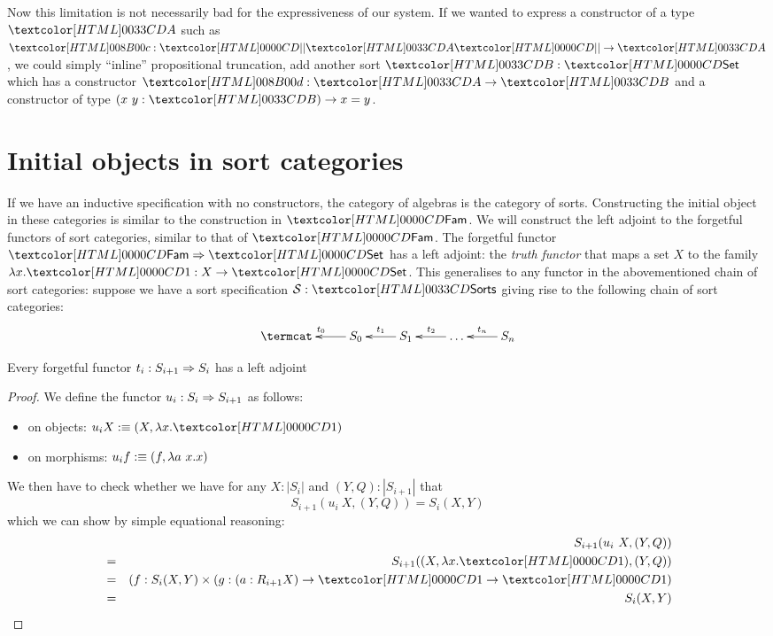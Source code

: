 Now this limitation is not necessarily bad for the expressiveness of
our system. If we wanted to express a constructor of a type $\Aty$
such as $\Ac : \proptrunc{\Aty} \to \Aty$, we could simply ``inline''
propositional truncation, \ie add another sort $\Bty : \Set$ which has
a constructor $\Bd : \Aty \to \Bty$ and a constructor of type
$(x\ y : \Bty) \to x = y$.

\section{Initial objects in sort categories}

If we have an inductive specification with no constructors, the
category of algebras is the category of sorts. Constructing the
initial object in these categories is similar to the construction in
$\Fam$. We will construct the left adjoint to the forgetful functors
of sort categories, similar to that of $\Fam$. The forgetful functor
$\Func{\Fam}{\Set}$ has a left adjoint: the \emph{truth functor} that
maps a set $X$ to the family $\lambda x . \unitty : X \to \Set$. This
generalises to any functor in the abovementioned chain of sort
categories: suppose we have a sort specification $\Ss : \sortsty$
giving rise to the following chain of sort categories:
$$
\xymatrix{
\termcat &S_0 \ar[l]_{t_0} &S_1 \ar[l]_{t_1} &\hdots \ar[l]_{t_2} &S_n \ar[l]_{t_n}
}
$$

\begin{proposition}
Every forgetful functor $t_i : S_{i+1} \Rightarrow S_i$ has a left adjoint
\end{proposition}

\begin{proof}
  We define the functor $u_i : S_i \Rightarrow S_{i+1}$ as follows:
  \begin{itemize}
  \item on objects: $u_i X \ddefeq (X , \lambda x . \unitty)$
  \item on morphisms: $u_i f :\equiv (f , \lambda a\ x . x)$
  \end{itemize}
  We then have to check whether we have for any $X : | S_i |$ and
  $(Y,Q) : | S_{i+1} |$ that
  $$
  S_{i+1}(u_i\ X , (Y,Q)) = S_i(X,Y)
  $$
  which we can show by simple equational reasoning:
  \begin{align*}
      &&S_{i+1}(u_i\ X , (Y,Q)) \\
    &=& S_{i+1}((X,\lambda x . \unitty), (Y,Q)) \\
    &=& (f : S_i(X,Y) \times (g : (a : R_{i+1} X) \to \unitty \to \unitty) \\
    &=& S_i(X,Y)
  \end{align*}

\end{proof}

